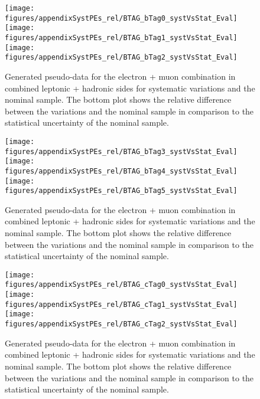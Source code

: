 \begin{figure}[!hb]
\begin{center}
        \texttt{[image: figures/appendixSystPEs\_rel/BTAG\_bTag0\_systVsStat\_Eval]}\\
        \texttt{[image: figures/appendixSystPEs\_rel/BTAG\_bTag1\_systVsStat\_Eval]}\\
        \texttt{[image: figures/appendixSystPEs\_rel/BTAG\_bTag2\_systVsStat\_Eval]}
  
        \caption{Generated pseudo-data for the electron + muon combination in combined leptonic + hadronic sides for systematic variations and the nominal \ttbar sample. The bottom plot shows the relative difference between the variations and the nominal sample in comparison to the statistical uncertainty of the nominal sample.}   
        \label{fig:systematicVar_lephad_Btag_1_1}
        \end{center}                          
        \end{figure}

\begin{figure}[!hb]
\begin{center}
        \texttt{[image: figures/appendixSystPEs\_rel/BTAG\_bTag3\_systVsStat\_Eval]}\\
        \texttt{[image: figures/appendixSystPEs\_rel/BTAG\_bTag4\_systVsStat\_Eval]}\\
        \texttt{[image: figures/appendixSystPEs\_rel/BTAG\_bTag5\_systVsStat\_Eval]}
  
        \caption{Generated pseudo-data for the electron + muon combination in combined leptonic + hadronic sides for systematic variations and the nominal \ttbar sample. The bottom plot shows the relative difference between the variations and the nominal sample in comparison to the statistical uncertainty of the nominal sample.}   
        \label{fig:systematicVar_lephad_Btag_1_2}
        \end{center}                          
        \end{figure}
\begin{figure}[!hb]
\begin{center}
        \texttt{[image: figures/appendixSystPEs\_rel/BTAG\_cTag0\_systVsStat\_Eval]}\\
        \texttt{[image: figures/appendixSystPEs\_rel/BTAG\_cTag1\_systVsStat\_Eval]}\\
        \texttt{[image: figures/appendixSystPEs\_rel/BTAG\_cTag2\_systVsStat\_Eval]}
  
        \caption{Generated pseudo-data for the electron + muon combination in combined leptonic + hadronic sides for systematic variations and the nominal \ttbar sample. The bottom plot shows the relative difference between the variations and the nominal sample in comparison to the statistical uncertainty of the nominal sample.}   
        \label{fig:systematicVar_lephad_Btag_2_1}
        \end{center}                          
        \end{figure}


